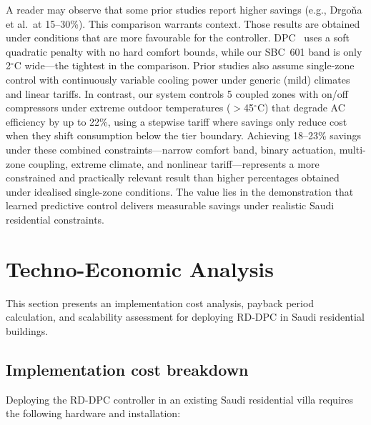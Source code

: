 \documentclass[12pt]{article}
\theoremstyle{plain}
\theoremstyle{definition}
\begin{document}
A reader may observe that some prior studies report higher savings (e.g., Drgo\v{n}a et al.\ at 15--30\%). This comparison warrants context. Those results are obtained under conditions that are more favourable for the controller. DPC~\cite{drgona2024dpc} uses a soft quadratic penalty with no hard comfort bounds, while our SBC~601 band is only 2$^\circ$C wide---the tightest in the comparison. Prior studies also assume single-zone control with continuously variable cooling power under generic (mild) climates and linear tariffs. In contrast, our system controls 5 coupled zones with on/off compressors under extreme outdoor temperatures ($>$45$^\circ$C) that degrade AC efficiency by up to 22\%, using a stepwise tariff where savings only reduce cost when they shift consumption below the tier boundary. Achieving 18--23\% savings under these combined constraints---narrow comfort band, binary actuation, multi-zone coupling, extreme climate, and nonlinear tariff---represents a more constrained and practically relevant result than higher percentages obtained under idealised single-zone conditions. The value lies in the demonstration that learned predictive control delivers measurable savings under realistic Saudi residential constraints.

\section{Techno-Economic Analysis}\label{sec:techno}

This section presents an implementation cost analysis, payback period calculation, and scalability assessment for deploying RD-DPC in Saudi residential buildings.

\subsection{Implementation cost breakdown}

Deploying the RD-DPC controller in an existing Saudi residential villa requires the following hardware and installation:
\end{document}
